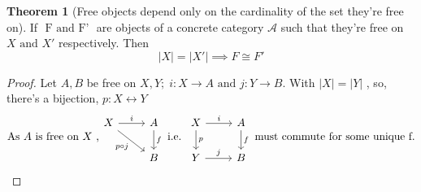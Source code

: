 \documentclass{article}
\theoremstyle{definition}
\theoremstyle{definition}
\newtheorem{theorem}{Theorem}[section]
\begin{document}
\begin{theorem}[Free objects depend only on the cardinality of the set they're free on] %
	If $ \text{ F and F' }$ are objects of a concrete category $ \mathcal{A} $ such that they're free on $ X \text{ and } X' $ respectively. Then
	\[ |X|=|X'| \implies F \cong F'\]
\end{theorem}
\begin{proof}
Let $ A,B $ be free on $ X,Y ;\; i:X \rightarrow A \text{ and } j:Y \rightarrow B $. With $ |X|=|Y| $ , so, there's a bijection, $ p: X \leftrightarrow Y $
\begin{equation}
\text{As $ A$  is free on $ X $ ,}
\begin{tikzcd}
	X \arrow{r}{i} \arrow[swap]{dr}{p \circ j} & A  \arrow{d}{f} \\ & B
\end{tikzcd}
	\text{ i.e. }
	\begin{tikzcd}
		X \arrow{r}{i} \arrow{d}{p} & A  \arrow{d}{f} \\ Y \arrow{r}{j} & B
	\end{tikzcd}
\text{ must commute for some unique f.}
\end{equation}


\end{proof}
\end{document}

